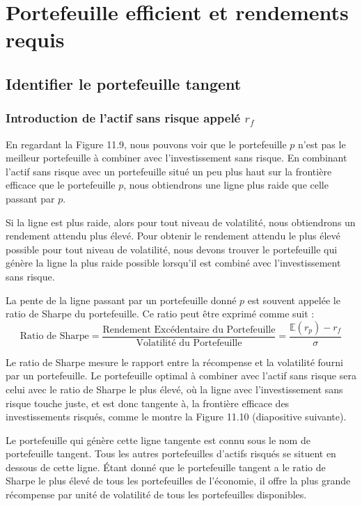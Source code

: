 \documentclass[a4paper, 12pt]{report}
\begin{document}
\section{Portefeuille efficient et rendements requis}

\subsection{Identifier le portefeuille tangent}

\subsubsection{Introduction de l'actif sans risque appelé \( r_f \)}

En regardant la Figure 11.9, nous pouvons voir que le portefeuille \( p \) n'est pas le meilleur portefeuille à combiner avec l'investissement sans risque. En combinant l'actif sans risque avec un portefeuille situé un peu plus haut sur la frontière efficace que le portefeuille \( p \), nous obtiendrons une ligne plus raide que celle passant par \( p \).

Si la ligne est plus raide, alors pour tout niveau de volatilité, nous obtiendrons un rendement attendu plus élevé. Pour obtenir le rendement attendu le plus élevé possible pour tout niveau de volatilité, nous devons trouver le portefeuille qui génère la ligne la plus raide possible lorsqu'il est combiné avec l'investissement sans risque.

La pente de la ligne passant par un portefeuille donné \( p \) est souvent appelée le ratio de Sharpe du portefeuille. Ce ratio peut être exprimé comme suit :
\[
\text{Ratio de Sharpe} = \frac{\text{Rendement Excédentaire du Portefeuille}}{\text{Volatilité du Portefeuille}} = \frac{ \mathbb{E}(r_p) - r_f}{\sigma}
\]

Le ratio de Sharpe mesure le rapport entre la récompense et la volatilité fourni par un portefeuille. Le portefeuille optimal à combiner avec l'actif sans risque sera celui avec le ratio de Sharpe le plus élevé, où la ligne avec l'investissement sans risque touche juste, et est donc tangente à, la frontière efficace des investissements risqués, comme le montre la Figure 11.10 (diapositive suivante).

Le portefeuille qui génère cette ligne tangente est connu sous le nom de portefeuille tangent. Tous les autres portefeuilles d'actifs risqués se situent en dessous de cette ligne. Étant donné que le portefeuille tangent a le ratio de Sharpe le plus élevé de tous les portefeuilles de l'économie, il offre la plus grande récompense par unité de volatilité de tous les portefeuilles disponibles.
\end{document}
